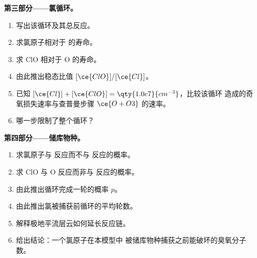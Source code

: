 \begin{problem}
\medskip\noindent\textbf{第三部分——氯循环。}
\begin{enumerate}[resume]
  \item 写出该循环及其总反应。
  \item 求氯原子相对于  的寿命。
  \item 求 ClO 相对于 O 的寿命。
  \item 由此推出稳态比值 $[\ce{ClO}]/[\ce{Cl}]$。
  \item 已知 $[\ce{Cl}] + [\ce{ClO}] = \qty{1.0e7}{cm^{-3}}$，比较该循环
        造成的奇氧损失速率与查普曼步骤 $\ce{O + O3}$ 的速率。
  \item 哪一步限制了整个循环？
\end{enumerate}

\medskip\noindent\textbf{第四部分——储库物种。}
\begin{enumerate}[resume]
  \item 求氯原子与  反应而不与
         反应的概率。
  \item 求 ClO 与 O 反应而非与  反应的概率。
  \item 由此推出循环完成一轮的概率 $p$。
  \item 由此推出氯被捕获前循环的平均轮数。
  \item 解释极地平流层云如何延长反应链。
  \item 给出结论：一个氯原子在本模型中
        被储库物种捕获之前能破坏的臭氧分子数。
\end{enumerate}
\end{problem}
